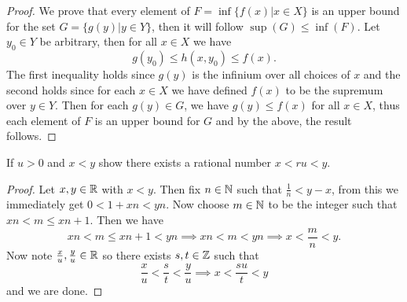 \begin{proof}
    We prove that every element of $F = \inf\{f(x) | x \in X\}$ is an upper bound for the set $G = \{g(y)| y \in Y\}$, then it will follow $\sup(G) \leq \inf(F)$. 
    Let $y_0 \in Y$ be arbitrary, then for all $x \in X$ we have 
    \[g(y_0) \leq h(x, y_0) \leq f(x).\]
    The first inequality holds since $g(y)$ is the infinium over all choices of $x$ and the second holds since for each $x \in X$ we have defined $f(x)$ to be the supremum over $y \in Y$. 
    Then for each $g(y) \in G$, we have $g(y) \leq f(x)$ for all $x \in X$, thus each element of $F$ is an upper bound for $G$ and by the above, the result follows. 
\end{proof}

\question 
If $u > 0$ and $x < y$ show there exists a rational number $x < ru< y$. 


\begin{proof}
    Let $x, y \in \mathbb{R}$ with $x < y$. Then fix $n \in \mathbb{N}$ such that $\frac{1}{n} < y - x$, from this we immediately get $0 < 1 + xn < yn$. Now choose 
    $m \in \mathbb{N}$ to be the integer such that $xn < m \leq xn + 1$. Then we have 
    \[xn < m \leq xn + 1 < yn \implies xn < m < yn \implies x < \frac{m}{n} < y.\]
    Now note $\frac{x}{u}, \frac{y}{u} \in \mathbb{R}$ so there exists $s, t \in \mathbb{Z}$ such that 
    \[\frac{x}{u} < \frac{s}{t} < \frac{y}{u} \implies x < \frac{su}{t} < y \]
    and we are done. 
\end{proof}
    
